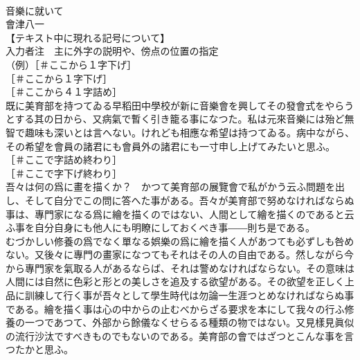 \documentclass[8pt]{extreport}
\begin{document}
\begin{CJK}{UTF8}{min}
\\	音樂に就いて
\\	會津八一
\\	【テキスト中に現れる記号について】
\\	入力者注　主に外字の説明や、傍点の位置の指定
\\	（例）［＃ここから１字下げ］
\\	［＃ここから１字下げ］
\\	［＃ここから４１字詰め］
\\	既に美育部を持つてゐる早稻田中學校が新に音樂會を興してその發會式をやらうとする其の日から、又病氣で暫く引き籠る事になつた。私は元來音樂には殆ど無智で趣味も深いとは言へない。けれども相應な希望は持つてゐる。病中ながら、その希望を會員の諸君にも會員外の諸君にも一寸申し上げてみたいと思ふ。
\\	［＃ここで字詰め終わり］
\\	［＃ここで字下げ終わり］
\\	吾々は何の爲に畫を描くか？　かつて美育部の展覽會で私がかう云ふ問題を出し、そして自分でこの問に答へた事がある。吾々が美育部で努めなければならぬ事は、專門家になる爲に繪を描くのではない、人間として繪を描くのであると云ふ事を自分自身にも他人にも明瞭にしておくべき事――則ち是である。
\\	むづかしい修養の爲でなく單なる娯樂の爲に繪を描く人があつても必ずしも咎めない。又後々に專門の畫家になつてもそれはその人の自由である。然しながら今から專門家を氣取る人があるならば、それは警めなければならない。その意味は人間には自然に色彩と形との美しさを追及する欲望がある。その欲望を正しく上品に訓練して行く事が吾々として學生時代は勿論一生涯つとめなければならぬ事である。繪を描く事は心の中からの止むべからざる要求を本にして我々の行ふ修養の一つであつて、外部から餘儀なくせらるる種類の物ではない。又見樣見眞似の流行沙汰ですべきものでもないのである。美育部の會ではざつとこんな事を言つたかと思ふ。

\end{CJK}
\end{document}
